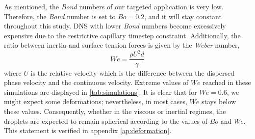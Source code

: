 \documentclass[11pt]{My_preprint}
\providecommand{\DIFadd}[1]{{\protect\color{blue}\uwave{#1}}} %
\providecommand{\DIFdel}[1]{{\protect\color{red}\sout{#1}}}                      %
\providecommand{\DIFaddbegin}{} %
\providecommand{\DIFaddend}{} %
\providecommand{\DIFdelbegin}{} %
\providecommand{\DIFdelend}{} %
\begin{document}
As mentioned, the \textit{Bond} numbers of our targeted application is very low.
Therefore, the \textit{Bond} number is set to \DIFdelbegin \DIFdel{$Bo = 0.2$}\DIFdelend \DIFaddbegin \DIFadd{$Bo = 0.5$}\DIFaddend , and it will stay constant throughout this study.
DNS with lower \textit{Bond} numbers become excessively expensive due to the restrictive capillary timestep constraint. 
Additionally, the ratio between inertia and surface tension forces is given by the \textit{Weber} number, 
\begin{equation*}
    We = \frac{\rho U^2d}{\gamma}\end{equation*}
where $U$ is the relative velocity which is the difference between the dispersed phase velocity and the continuous velocity. Extreme values of $We$ reached in these simulations are displayed in \ref{tab:simulations}. 
It is clear that for \DIFdelbegin \DIFdel{$We=0.6$}\DIFdelend \DIFaddbegin \DIFadd{$We=0.95$}\DIFaddend , we might expect some deformations; nevertheless, in most cases, $We$ stays below these values. 
Consequently, whether in the viscous or inertial regimes, the droplets are expected to remain spherical according to the values of $Bo$ and $We$.
This statement is verified in appendix \ref{ap:deformation}.
\end{document}
